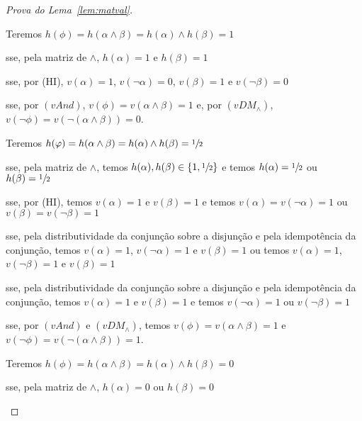 \begin{proof}[Prova do Lema~\ref{lem:matval}]
\begin{provaporcasos}
\begin{provaporsubcasos}
                    Teremos $h(\phi) = h(\alpha \land \beta) = h(\alpha) \land h(\beta) = 1$

                    \qquad{}sse, pela matriz de $\land$, $h(\alpha) = 1$ e $h(\beta) = 1$

                    \qquad{}sse, por (HI), $v(\alpha) = 1$, $v(\neg \alpha) = 0$, $v(\beta) = 1$ e $v(\neg \beta) = 0$

                    \qquad{}sse, por $(vAnd)$, $v(\phi) = v(\alpha \land \beta) = 1$ e, por $(vDM_{\land})$, $v(\neg \phi) = v(\neg(\alpha \land \beta)) = 0$.
            

                    Teremos $h(\varphi) = h(\alpha \land \beta) = h(\alpha) \land h(\beta) = \sfrac{1}{2}{}$

                    \qquad{}sse, pela matriz de $\land$, temos $h(\alpha), h(\beta) \in \{1, \sfrac{1}{2}{}\}$ e temos $h(\alpha) = \sfrac{1}{2}{}$ ou $h(\beta) = \sfrac{1}{2}{}$
                    
                    \qquad{}sse, por (HI), temos $v(\alpha) = 1$ e $v(\beta) = 1$ e temos $v(\alpha) = v(\neg \alpha) = 1$ ou $v(\beta) = v(\neg \beta) = 1$

                    \qquad{}sse, pela distributividade da conjunção sobre a disjunção e pela idempotência da conjunção, temos $v(\alpha) = 1$, $v(\neg \alpha) = 1$ e $v(\beta) = 1$ ou temos $v(\alpha) = 1$, $v(\neg \beta) = 1$ e $v(\beta) = 1$

                    \qquad{}sse, pela distributividade da conjunção sobre a disjunção e pela idempotência da conjunção, temos $v(\alpha) = 1$ e $v(\beta) = 1$ e temos $v(\neg \alpha) = 1$ ou $v(\neg \beta) = 1$

                    \qquad{}sse, por $(vAnd)$ e $(vDM_{\land})$, temos $v(\phi) = v(\alpha \land \beta) = 1$ e $v(\neg \phi) = v(\neg (\alpha \land \beta)) = 1$.


                    Teremos $h(\phi) = h(\alpha \land \beta) = h(\alpha) \land h(\beta) = 0$

                    \qquad{}sse, pela matriz de $\land$, $h(\alpha) = 0$ ou $h(\beta) = 0$


\end{provaporsubcasos}
\end{provaporcasos}
\end{proof}
